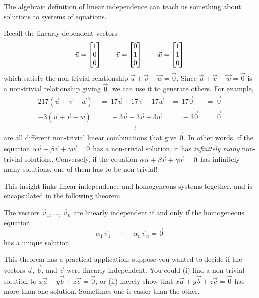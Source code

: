 
The algebraic definition of linear independence can teach us something about
solutions to systems of equations. 

Recall the linearly dependent vectors 
\[
	\vec u=\mat{1\\0\\0}\qquad \vec v=\mat{0\\1\\0}\qquad \vec w=\mat{1\\1\\0}
\]
which satisfy the non-trivial relationship $\vec u+\vec v-\vec w=\vec 0$. Since $\vec u+\vec v-\vec w=\vec 0$
is a non-trivial relationship giving $\vec 0$, we can use it to generate others. For example,
\begin{alignat*}{2}
	17(\vec u+\vec v-\vec w)\ &=\ 17\vec u+17\vec v-17\vec w\ &=\ 17\vec 0\ &=\ \vec 0\\
	-3(\vec u+\vec v-\vec w)\ &=\ -3\vec u-3\vec v+3\vec w\ &=\ -3\vec 0\ &=\ \vec 0\\
	&\hspace{5em}\vdots&&
\end{alignat*}
are all different non-trivial linear combinations that give $\vec 0$. In other words, if 
the equation $\alpha\vec u+\beta \vec v+\gamma \vec w=\vec 0$ has a non-trivial solution,
it has \emph{infinitely many} non-trivial solutions. Conversely, if  the equation
$\alpha\vec u+\beta \vec v+\gamma \vec w=\vec 0$ has infinitely many solutions, one of them
has to be non-trivial!


This insight links linear independence and homogeneous systems together, and is encapsulated
in the following theorem.

\begin{theorem}
	The vectors $\vec v_1$, \ldots, $\vec v_n$ are linearly independent if and only if
	the homogeneous equation
	\[
		\alpha_1\vec v_1+\cdots +\alpha_n\vec v_n=\vec 0
	\]
	has a unique solution.
\end{theorem}

This theorem has a practical application: suppose you wanted to decide if the vectors $\vec a$, $\vec b$, and
$\vec c$ were linearly independent. You could (i) find a non-trivial solution to $x\vec a+y\vec b+z\vec c=\vec 0$, 
or (ii) merely show that $x\vec a+y\vec b+z\vec c=\vec 0$ has more than one solution. Sometimes one is easier than
the other.

